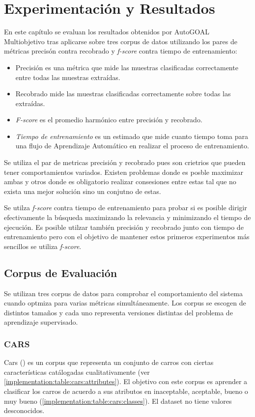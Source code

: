 \chapter{Experimentaci\'on y Resultados}\label{chapter:experiments}
En este cap\'itulo se evaluan los resultados obtenidos por AutoGOAL Multiobjetivo tras aplicarse sobre tres corpus de datos utilizando los pares de m\'etricas precis\'on contra recobrado y \textit{f-score} contra tiempo de entrenamiento:
\begin{itemize}
    \item Precisi\'on es una m\'etrica que mide las muestras clasificadas correctamente entre todas las muestras extra\'idas.
    \item Recobrado mide las muestras clasificadas correctamente sobre todas las extra\'idas.
    \item \textit{F-score} es el promedio harm\'onico entre precisi\'on y recobrado.
    \item \textit{Tiempo de entrenamiento} es un estimado que mide cuanto tiempo toma para una flujo de Aprendizaje Autom\'atico en realizar el proceso de entrenamiento.
\end{itemize}

Se utiliza el par de metricas precisi\'on y recobrado pues son crietrios que pueden tener comportamientos variados. Existen problemas donde es posble maximizar ambas y otros donde es obligatorio realizar consesiones entre estas tal que no exista una mejor soluci\'on sino un conjutno de estas.

Se utilza \textit{f-score} contra tiempo de entrenamiento para probar si es posible dirigir efectivamente  la b\'usqueda maximizando la relevancia y minimizando el tiempo de ejecuci\'on. Es posible utilzar tambi\'en precisi\'on y recobrado junto con tiempo de entrenamiento pero con el objetivo de mantener estos primeros experimentos m\'as sencillos se utiliza \textit{f-score}.

\section{Corpus de Evaluaci\'on}
Se utilizan tres corpus de datos para comprobar el comportamiento del sistema cuando optmiza para varias m\'etricas simult\'aneamente. Los corpus se escogen de distintos tamaños y cada uno representa versiones distintas del problema de aprendizaje supervisado.

\subsection{CARS}
Cars (\cite{Dua:2019}) es un corpus que representa un conjunto de carros con ciertas caracter\'isticas cat\'alogadas cualitativamente (ver \ref{implementation:table:cars:attributes}). El objetivo con este corpus es aprender a clasificar los carros de  acuerdo a sus atributos  en inaceptable, aceptable, bueno o muy bueno (\ref{implementation:table:cars:classes}). El dataset no tiene valores desconocidos.

